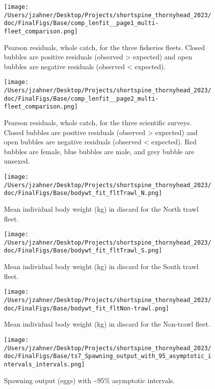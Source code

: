 \documentclass[11pt,
  english,
  letterpaper,
]{article}
\begin{document}
\begin{figure}
\centering
\texttt{[image: /Users/jzahner/Desktop/Projects/shortspine\_thornyhead\_2023/doc/FinalFigs/Base/comp\_lenfit\_\_page1\_multi-fleet\_comparison.png]}
\caption{Pearson residuals, whole catch, for the three fisheries fleets. Closed bubbles are positive residuals (observed \textgreater{} expected) and open bubbles are negative residuals (observed \textless{} expected).\label{fig:resids_fisheries}}
\end{figure}

\begin{figure}
\centering
\texttt{[image: /Users/jzahner/Desktop/Projects/shortspine\_thornyhead\_2023/doc/FinalFigs/Base/comp\_lenfit\_\_page2\_multi-fleet\_comparison.png]}
\caption{Pearson residuals, whole catch, for the three scientific surveys. Closed bubbles are positive residuals (observed \textgreater{} expected) and open bubbles are negative residuals (observed \textless{} expected). Red bubbles are female, blue bubbles are male, and grey bubble are unsexed.\label{fig:resids_survey}}
\end{figure}

\begin{figure}
\centering
\texttt{[image: /Users/jzahner/Desktop/Projects/shortspine\_thornyhead\_2023/doc/FinalFigs/Base/bodywt\_fit\_fltTrawl\_N.png]}
\caption{Mean individual body weight (kg) in discard for the North trawl fleet.\label{fig:weightNorthTrl}}
\end{figure}

\begin{figure}
\centering
\texttt{[image: /Users/jzahner/Desktop/Projects/shortspine\_thornyhead\_2023/doc/FinalFigs/Base/bodywt\_fit\_fltTrawl\_S.png]}
\caption{Mean individual body weight (kg) in discard for the South trawl fleet.\label{fig:weightSouthTrl}}
\end{figure}

\begin{figure}
\centering
\texttt{[image: /Users/jzahner/Desktop/Projects/shortspine\_thornyhead\_2023/doc/FinalFigs/Base/bodywt\_fit\_fltNon-trawl.png]}
\caption{Mean individual body weight (kg) in discard for the Non-trawl fleet.\label{fig:weightNonTrl}}
\end{figure}

\begin{figure}
\centering
\texttt{[image: /Users/jzahner/Desktop/Projects/shortspine\_thornyhead\_2023/doc/FinalFigs/Base/ts7\_Spawning\_output\_with\_95\_asymptotic\_intervals\_intervals.png]}
\caption{Spawning output (eggs) with \textasciitilde95\% asymptotic intervals.\label{fig:spawnout}}
\end{figure}
\end{document}

